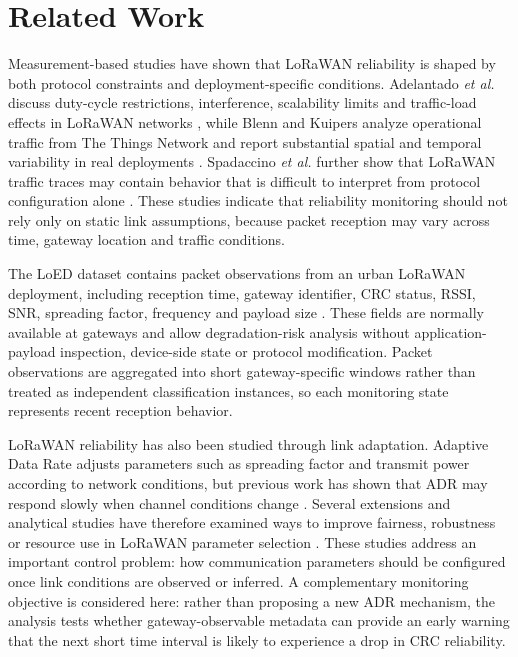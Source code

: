 \documentclass{jot}
\begin{document}
\section{Related Work}\label{s:2}
Measurement-based studies have shown that LoRaWAN reliability is shaped by both protocol constraints and deployment-specific conditions. Adelantado \textit{et al.} discuss duty-cycle restrictions, interference, scalability limits and traffic-load effects in LoRaWAN networks \cite{3}, while Blenn and Kuipers analyze operational traffic from The Things Network and report substantial spatial and temporal variability in real deployments \cite{4}. Spadaccino \textit{et al.} further show that LoRaWAN traffic traces may contain behavior that is difficult to interpret from protocol configuration alone \cite{9}. These studies indicate that reliability monitoring should not rely only on static link assumptions, because packet reception may vary across time, gateway location and traffic conditions.

The LoED dataset contains packet observations from an urban LoRaWAN deployment, including reception time, gateway identifier, CRC status, RSSI, SNR, spreading factor, frequency and payload size \cite{8}. These fields are normally available at gateways and allow degradation-risk analysis without application-payload inspection, device-side state or protocol modification. Packet observations are aggregated into short gateway-specific windows rather than treated as independent classification instances, so each monitoring state represents recent reception behavior.

LoRaWAN reliability has also been studied through link adaptation. Adaptive Data Rate adjusts parameters such as spreading factor and transmit power according to network conditions, but previous work has shown that ADR may respond slowly when channel conditions change \cite{5}. Several extensions and analytical studies have therefore examined ways to improve fairness, robustness or resource use in LoRaWAN parameter selection \cite{6,7}. These studies address an important control problem: how communication parameters should be configured once link conditions are observed or inferred. A complementary monitoring objective is considered here: rather than proposing a new ADR mechanism, the analysis tests whether gateway-observable metadata can provide an early warning that the next short time interval is likely to experience a drop in CRC reliability.
\end{document}
